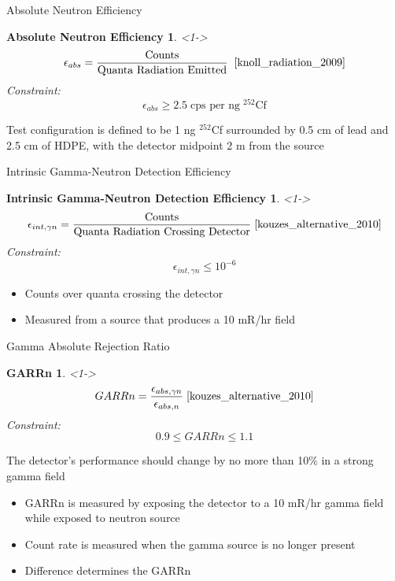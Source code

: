 \begin{frame}{Absolute Neutron Efficiency}
\newtheorem{pnnlTHM1}{Absolute Neutron Efficiency}
\begin{pnnlTHM1}<1->
$$\epsilon_{abs} = \frac{\text{Counts}}{\text{Quanta Radiation Emitted}}\; \; \protect \cite{knoll_radiation_2009} $$
Constraint:
$$\epsilon_{abs} \geq 2.5\; \text{cps per ng}\; {}^{252}\text{Cf}$$
\end{pnnlTHM1}
Test configuration is defined to be 1 ng ${}^{252}$Cf surrounded by 0.5 cm of lead and 2.5 cm of HDPE, with the detector midpoint 2 m from the source \cite{kouzes_alternative_2010}
\hyperlink{DHSCriteria}{}
\hyperlink{toc}{}
\end{frame}

\begin{frame}{Intrinsic Gamma-Neutron Detection Efficiency}
\newtheorem{pnnlTHM2}{Intrinsic Gamma-Neutron Detection Efficiency}
\begin{pnnlTHM2}<1->
$$\epsilon_{int,\gamma n} = \frac{\text{Counts}}{\text{Quanta Radiation Crossing Detector}} \; \protect \cite{kouzes_alternative_2010} $$
Constraint:
$$ \epsilon_{int,\gamma n} \leq 10^{-6} $$
\end{pnnlTHM2}
\begin{itemize}
	\item Counts over quanta crossing the detector
	\item Measured from a source that produces a 10 mR/hr field
\end{itemize}
\hyperlink{DHSCriteria}{}
\hyperlink{toc}{}
\end{frame}

\begin{frame}[fragile]{Gamma Absolute Rejection Ratio}
\newtheorem{pnnlTHM3}{GARRn}
\begin{pnnlTHM3}<1->
$$ GARRn = \frac{\epsilon_{abs,\gamma n}}{\epsilon_{abs,n}} \; \protect \cite{kouzes_alternative_2010} $$
Constraint:
$$ 0.9 \leq GARRn \leq 1.1 $$
\end{pnnlTHM3}
The detector's performance should change by no more than 10\% in a strong gamma field
\begin{itemize}
	\item GARRn is measured by exposing the detector to a 10 mR/hr gamma field while exposed to neutron source
	\item Count rate is measured when the gamma source is no longer present
	\item Difference determines the GARRn
\end{itemize}
\hyperlink{DHSCriteria}{}
\hyperlink{toc}{}
\end{frame}

